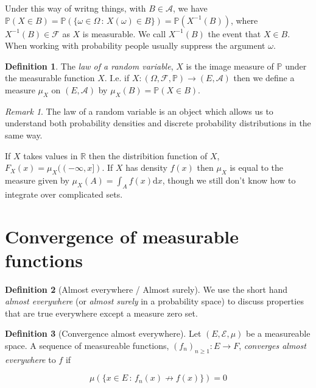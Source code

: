 \documentclass[
]{book}
\theoremstyle{definition}
\newtheorem{definition}{Definition}[chapter]
\theoremstyle{definition}
\theoremstyle{definition}
\theoremstyle{definition}
\theoremstyle{remark}
\newtheorem*{remark}{Remark}
\begin{document}
Under this way of writng things, with \(B \in \mathcal{A}\), we have \(\mathbb{P}(X \in B) = \mathbb{P}(\{ \omega \in \Omega \,:\, X(\omega) \in B\}) = \mathbb{P}( X^{-1}(B))\), where \(X^{-1}(B) \in \mathcal{F}\) as \(X\) is measurable. We call \(X^{-1}(B)\) the event that \(X \in B\). When working with probability people usually suppress the argument \(\omega\).

\begin{definition}
The \emph{law of a random variable}, \(X\) is the image measure of \(\mathbb{P}\) under the measurable function \(X\). I.e. if \(X: (\Omega, \mathcal{F}, \mathbb{P}) \rightarrow (E, \mathcal{A})\) then we define a measure \(\mu_X\) on \((E, \mathcal{A})\) by \(\mu_X(B) = \mathbb{P}(X \in B)\).
\end{definition}

\begin{remark}
The law of a random variable is an object which allows us to understand both probability densities and discrete probability distributions in the same way.

If \(X\) takes values in \(\mathbb{R}\) then the distribition function of \(X\), \(F_X(x) = \mu_X((-\infty, x])\). If \(X\) has density \(f(x)\) then \(\mu_X\) is equal to the measure given by \(\mu_X(A) = \int_A f(x) \mathrm{d}x\), though we still don't know how to integrate over complicated sets.
\end{remark}

\hypertarget{convergence-of-measurable-functions}{%
\section{Convergence of measurable functions}\label{convergence-of-measurable-functions}}

\begin{definition}[Almost everywhere / Almost surely]
We use the short hand \emph{almost everywhere} (or \emph{almost surely} in a probability space) to discuss properties that are true everywhere except a measure zero set.
\end{definition}

\begin{definition}[Convergence almost everywhere]
Let \((E, \mathcal{E}, \mu)\) be a measureable space. A sequence of measureable functions, \((f_n)_{n \geq 1}: E \rightarrow F\), \emph{converges almost everywhere} to \(f\) if

\[ \mu \left( \{ x \in E \,:\, f_n(x) \not\to f(x) \} \right) = 0 \]
\end{definition}
\end{document}
